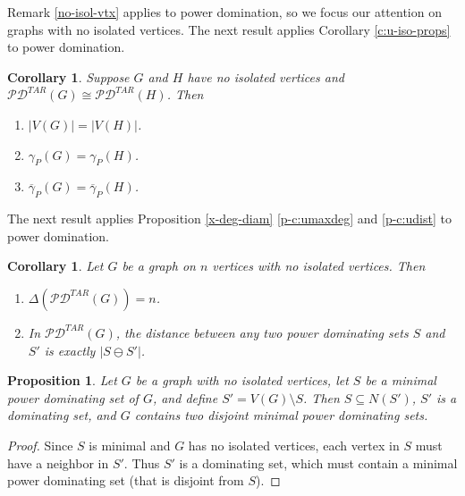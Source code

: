 \documentclass{article}
\numberwithin{figure}{section}   %
\newtheorem{cor}[thm]{Corollary}
\newtheorem{prop}[thm]{Proposition}
\theoremstyle{definition}
\newtheorem{rem}[thm]{Remark}
\theoremstyle{definition}
\theoremstyle{definition}
\newcommand{\ol}{\overline}
\newcommand{\ben}{\begin{enumerate}}
\newcommand{\een}{\end{enumerate}}
\newcommand{\bpf}{\begin{proof}}
\newcommand{\epf}{\end{proof}\ms}
\newcommand{\ms}{\medskip}
\newcommand{\diam}{\operatorname{diam}}
\newcommand{\pd}{\gamma_P}
\newcommand{\pdbar}{\ol\pd}
\newcommand{\tar}{\mathscr{PD}^{TAR}}
\newcommand{\xtar}{\mathscr{X}^{TAR}}
\newcommand{\clr}[1]{{\textcolor{red}{[}\textcolor{red}{{CR: \em #1}]}}}
\begin{document}
 
Remark \ref{no-isol-vtx} applies to power domination, so we focus our attention on graphs with no isolated vertices.  The next result applies Corollary \ref{c:u-iso-props} to power domination.

\begin{cor}\label{c:pd-iso-props}
Suppose $G$ and $H$ have no isolated vertices and $\tar(G)\cong\tar(H)$. Then
\ben
\item $|V(G)|=|V(H)|$.
\item $\pd(G)=\pd(H)$.
\item $\pdbar(G)=\pdbar(H)$. 
\een
\end{cor}
The next result applies Proposition  \ref{x-deg-diam} \eqref{p-c:umaxdeg} and \eqref{p-c:udist} to power domination.
\begin{cor}\label{pd-deg-dist} 
Let  $G$ be a graph on $n$ vertices with no isolated vertices. Then 
\ben\item 
$\Delta(\tar (G))=n$.
\item In $\tar(G)$, the distance between any two power dominating sets $S$ and $S'$ is exactly $|S\ominus  S'|$.
\een
\end{cor}


\begin{prop}\label{lem:neighbors} Let $G$ be a graph with no isolated vertices, let $S$ be a minimal power dominating set of $G$, and define $S'=V(G)\setminus S$. Then $S\subseteq N(S') $, $S'$  is a dominating set,  and $G$  contains two disjoint minimal power dominating sets.
\end{prop}
\bpf  Since $S$ is minimal and $G$ has no isolated vertices, each vertex in $S$ must have a neighbor in $S'$. Thus $S'$ is a dominating set, which must contain a minimal power dominating set (that is disjoint from $S$).
\epf
\end{document}
